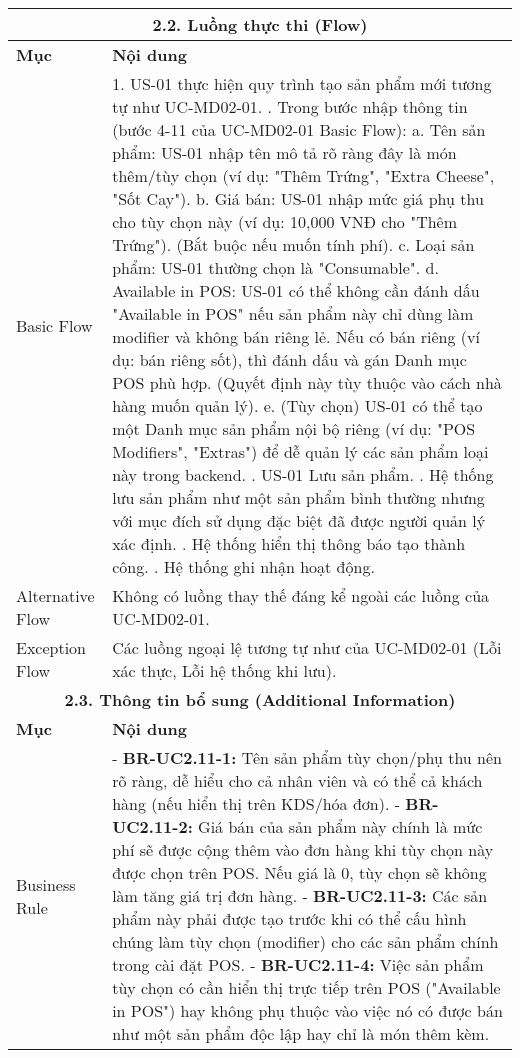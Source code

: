 \begin{longtable}{|m{4cm}|p{11cm}|}
\hline
\multicolumn{2}{|c|}{\textbf{2.2. Luồng thực thi (Flow)}} \\
\hline
\textbf{Mục} & \textbf{Nội dung} \\
\hline
Basic Flow & 1. US-01 thực hiện quy trình tạo sản phẩm mới tương tự như UC-MD02-01. \newline 2. Trong bước nhập thông tin (bước 4-11 của UC-MD02-01 Basic Flow): \newline    a. Tên sản phẩm: US-01 nhập tên mô tả rõ ràng đây là món thêm/tùy chọn (ví dụ: "Thêm Trứng", "Extra Cheese", "Sốt Cay"). \newline    b. Giá bán: US-01 nhập mức giá phụ thu cho tùy chọn này (ví dụ: 10,000 VNĐ cho "Thêm Trứng"). (Bắt buộc nếu muốn tính phí). \newline    c. Loại sản phẩm: US-01 thường chọn là "Consumable". \newline    d. Available in POS: US-01 có thể không cần đánh dấu "Available in POS" nếu sản phẩm này chỉ dùng làm modifier và không bán riêng lẻ. Nếu có bán riêng (ví dụ: bán riêng sốt), thì đánh dấu và gán Danh mục POS phù hợp. (Quyết định này tùy thuộc vào cách nhà hàng muốn quản lý). \newline    e. (Tùy chọn) US-01 có thể tạo một Danh mục sản phẩm nội bộ riêng (ví dụ: "POS Modifiers", "Extras") để dễ quản lý các sản phẩm loại này trong backend. \newline 3. US-01 Lưu sản phẩm. \newline 4. Hệ thống lưu sản phẩm như một sản phẩm bình thường nhưng với mục đích sử dụng đặc biệt đã được người quản lý xác định. \newline 5. Hệ thống hiển thị thông báo tạo thành công. \newline 6. Hệ thống ghi nhận hoạt động. \\
\hline
Alternative Flow & Không có luồng thay thế đáng kể ngoài các luồng của UC-MD02-01. \\
\hline
Exception Flow & Các luồng ngoại lệ tương tự như của UC-MD02-01 (Lỗi xác thực, Lỗi hệ thống khi lưu). \\
\hline
\multicolumn{2}{|c|}{\textbf{2.3. Thông tin bổ sung (Additional Information)}} \\
\hline
\textbf{Mục} & \textbf{Nội dung} \\
\hline
Business Rule & - \textbf{BR-UC2.11-1:} Tên sản phẩm tùy chọn/phụ thu nên rõ ràng, dễ hiểu cho cả nhân viên và có thể cả khách hàng (nếu hiển thị trên KDS/hóa đơn). \newline - \textbf{BR-UC2.11-2:} Giá bán của sản phẩm này chính là mức phí sẽ được cộng thêm vào đơn hàng khi tùy chọn này được chọn trên POS. Nếu giá là 0, tùy chọn sẽ không làm tăng giá trị đơn hàng. \newline - \textbf{BR-UC2.11-3:} Các sản phẩm này phải được tạo trước khi có thể cấu hình chúng làm tùy chọn (modifier) cho các sản phẩm chính trong cài đặt POS. \newline - \textbf{BR-UC2.11-4:} Việc sản phẩm tùy chọn có cần hiển thị trực tiếp trên POS ("Available in POS") hay không phụ thuộc vào việc nó có được bán như một sản phẩm độc lập hay chỉ là món thêm kèm. \\

\end{longtable}
